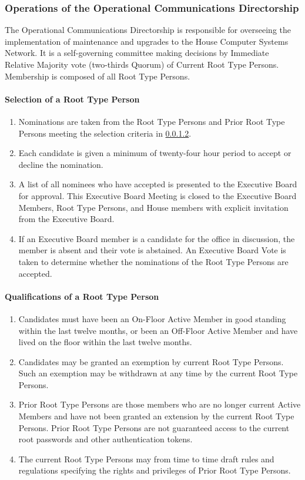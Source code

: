 \documentclass{article}
\newcommand{\asubsection}[1]{\subsubsection{#1} \label{#1}}
\newcommand{\asubsubsection}[1]{\paragraph{#1} \label{#1}}
\begin{document}
\asubsection{Operations of the Operational Communications Directorship}
The Operational Communications Directorship is responsible for overseeing the implementation of maintenance and upgrades to the House Computer Systems Network.
It is a self-governing committee making decisions by Immediate Relative Majority vote (two-thirds Quorum) of Current Root Type Persons.
Membership is composed of all Root Type Persons.

\asubsubsection{Selection of a Root Type Person}
\renewcommand{\theenumi}{\alph{enumi}} %
\begin{enumerate}
	\item Nominations are taken from the Root Type Persons and Prior Root Type Persons meeting the selection criteria in \ref{Qualifications of a Root Type Person}.
	\item Each candidate is given a minimum of twenty-four hour period to accept or decline the nomination.
	\item A list of all nominees who have accepted is presented to the Executive Board for approval.
		This Executive Board Meeting is closed to the Executive Board Members, Root Type Persons, and House members with explicit invitation from the Executive Board.
	\item If an Executive Board member is a candidate for the office in discussion, the member is absent and their vote is abstained.
		An Executive Board Vote is taken to determine whether the nominations of the Root Type Persons are accepted.
\end{enumerate}

\asubsubsection{Qualifications of a Root Type Person}
\renewcommand{\theenumi}{\alph{enumi}} %
\begin{enumerate}
	\item Candidates must have been an On-Floor Active Member in good standing within the last twelve months, or been an Off-Floor Active Member and have lived on the floor within the last twelve months.
	\item Candidates may be granted an exemption by current Root Type Persons.
		Such an exemption may be withdrawn at any time by the current Root Type Persons.
	\item Prior Root Type Persons are those members who are no longer current Active Members and have not been granted an extension by the current Root Type Persons.
		Prior Root Type Persons are not guaranteed access to the current root passwords and other authentication tokens.
	\item The current Root Type Persons may from time to time draft rules and regulations specifying the rights and privileges of Prior Root Type Persons.
\end{enumerate}
\end{document}
